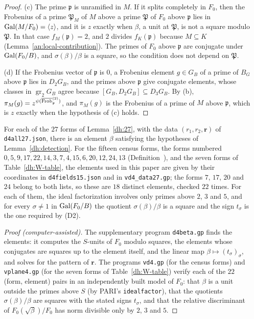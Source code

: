 \begin{proof}
(c) The prime $\mathfrak p$ is unramified in $M$. If it splits completely in
$F_0$, then the Frobenius of a prime $\mathfrak P_M$ of $M$ above a prime
$\mathfrak P$ of $F_0$ above $\mathfrak p$ lies in $\operatorname{Gal}(M/F_0)=\langle
z\rangle$, and it is $z$ exactly when $\beta$, a unit at $\mathfrak P$, is not
a square modulo $\mathfrak P$. In that case $f_M(\mathfrak p)=2$, and $2$
divides $f_K(\mathfrak p)$ because $M\subseteq K$
(Lemma~\ref{an:local-contribution}). The primes of $F_0$ above $\mathfrak p$
are conjugate under $\operatorname{Gal}(F_0/B)$, and $\sigma(\beta)/\beta$ is a square, so
the condition does not depend on $\mathfrak P$.

(d) If the Frobenius vector of $\mathfrak p$ is $0$, a Frobenius element
$g\in G_B$ of a prime of $B_G$ above $\mathfrak p$ lies in $D_2G_B$, and the
primes above $\mathfrak p$ give conjugate elements, whose classes in
$\operatorname{gr}_2G_B$ agree because $[G_B,D_2G_B]\subseteq D_3G_B$. By (b),
$\pi_M(g)=z^{\psi(\overline{\operatorname{Frob}}^{(2)}_{\mathfrak p})}$, and $\pi_M(g)$ is
the Frobenius of a prime of $M$ above $\mathfrak p$, which is $z$ exactly when
the hypothesis of (c) holds.
\end{proof}

\begin{lemma}\label{dh:beta-exists}
For each of the $27$ forms of Lemma~\ref{dh:27}, with the data
$(r_1,r_2,\mathbf r)$ of \texttt{d4all27.json}, there is an element $\beta$
satisfying the hypotheses of Lemma~\ref{dh:detection}. For the fifteen
census forms, the forms numbered $0,5,9,17,22,14,3,7,4,15,6,20,12,24,13$
(Definition~), and the seven forms of
Table~\ref{dh:W-table}, the elements used in this paper are given by their
coordinates in \texttt{d4fields15.json} and in \texttt{vd4\_data27.gp}; the
forms $7$, $17$, $20$ and $24$ belong to both lists, so these are $18$
distinct elements, checked $22$ times. For each of them, the ideal
factorization involves only primes above $2$, $3$ and $5$, and for every
$\sigma\ne1$ in $\operatorname{Gal}(F_0/B)$ the quotient $\sigma(\beta)/\beta$ is a square
and the sign $t_\sigma$ is the one required by (D2).
\end{lemma}

\begin{proof}[Proof (computer-assisted)]
The supplementary program \texttt{d4beta.gp} finds the elements: it computes
the $S$-units of $F_0$ modulo squares, the elements whose conjugates are
squares up to the element itself, and the linear map
$\beta\mapsto(t_\sigma)_\sigma$, and solves for the pattern of $\mathbf r$.
The programs \texttt{vd4.gp} (for the census forms) and \texttt{vplane4.gp}
(for the seven forms of Table~\ref{dh:W-table}) verify each of the $22$
(form, element) pairs in an independently built model of $F_0$: that $\beta$ is a unit
outside the primes above $S$ (by PARI's \texttt{idealfactor}), that the
quotients $\sigma(\beta)/\beta$ are squares with the stated signs
$t_\sigma$, and that the relative discriminant of $F_0(\sqrt\beta)/F_0$ has
norm divisible only by $2$, $3$ and $5$.
\end{proof}

